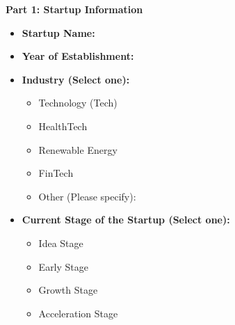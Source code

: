 \documentclass[../Main.tex]{subfiles}%
\begin{document}
	\textbf{Part 1: Startup Information}
	\begin{itemize}
		\item \textbf{Startup Name:} \underline{\hspace{4cm}}
		\item \textbf{Year of Establishment:} \underline{\hspace{4cm}}
		\item \textbf{Industry (Select one):}
		\begin{itemize}
			\item Technology (Tech)
			\item HealthTech
			\item Renewable Energy
			\item FinTech
			\item Other (Please specify): \underline{\hspace{4cm}}
		\end{itemize}
		\item \textbf{Current Stage of the Startup (Select one):}
		\begin{itemize}
			\item Idea Stage
			\item Early Stage
			\item Growth Stage
			\item Acceleration Stage
		\end{itemize}
	\end{itemize}
	
\end{document}
